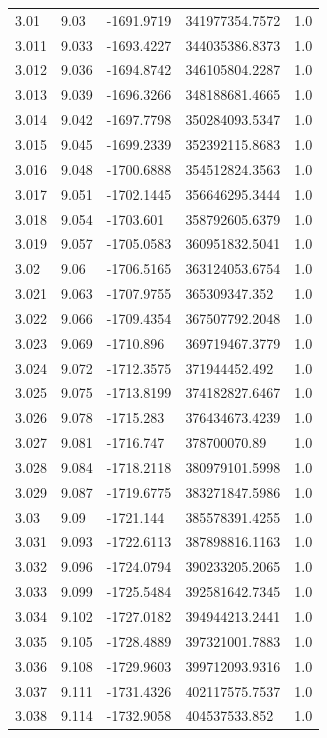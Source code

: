 \begin{tabular}{lllll}
3.01 & 9.03 & -1691.9719 & 341977354.7572 & 1.0 \\
3.011 & 9.033 & -1693.4227 & 344035386.8373 & 1.0 \\
3.012 & 9.036 & -1694.8742 & 346105804.2287 & 1.0 \\
3.013 & 9.039 & -1696.3266 & 348188681.4665 & 1.0 \\
3.014 & 9.042 & -1697.7798 & 350284093.5347 & 1.0 \\
3.015 & 9.045 & -1699.2339 & 352392115.8683 & 1.0 \\
3.016 & 9.048 & -1700.6888 & 354512824.3563 & 1.0 \\
3.017 & 9.051 & -1702.1445 & 356646295.3444 & 1.0 \\
3.018 & 9.054 & -1703.601 & 358792605.6379 & 1.0 \\
3.019 & 9.057 & -1705.0583 & 360951832.5041 & 1.0 \\
3.02 & 9.06 & -1706.5165 & 363124053.6754 & 1.0 \\
3.021 & 9.063 & -1707.9755 & 365309347.352 & 1.0 \\
3.022 & 9.066 & -1709.4354 & 367507792.2048 & 1.0 \\
3.023 & 9.069 & -1710.896 & 369719467.3779 & 1.0 \\
3.024 & 9.072 & -1712.3575 & 371944452.492 & 1.0 \\
3.025 & 9.075 & -1713.8199 & 374182827.6467 & 1.0 \\
3.026 & 9.078 & -1715.283 & 376434673.4239 & 1.0 \\
3.027 & 9.081 & -1716.747 & 378700070.89 & 1.0 \\
3.028 & 9.084 & -1718.2118 & 380979101.5998 & 1.0 \\
3.029 & 9.087 & -1719.6775 & 383271847.5986 & 1.0 \\
3.03 & 9.09 & -1721.144 & 385578391.4255 & 1.0 \\
3.031 & 9.093 & -1722.6113 & 387898816.1163 & 1.0 \\
3.032 & 9.096 & -1724.0794 & 390233205.2065 & 1.0 \\
3.033 & 9.099 & -1725.5484 & 392581642.7345 & 1.0 \\
3.034 & 9.102 & -1727.0182 & 394944213.2441 & 1.0 \\
3.035 & 9.105 & -1728.4889 & 397321001.7883 & 1.0 \\
3.036 & 9.108 & -1729.9603 & 399712093.9316 & 1.0 \\
3.037 & 9.111 & -1731.4326 & 402117575.7537 & 1.0 \\
3.038 & 9.114 & -1732.9058 & 404537533.852 & 1.0 \\

\end{tabular}
